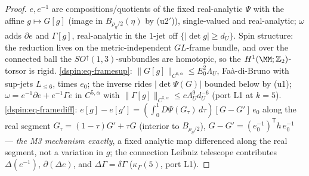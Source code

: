 \begin{proof}
$e,e^{-1}$ are compositions/quotients of the fixed real-analytic $\Psi$ with
the affine $g\mapsto G[g]$ (image in $B_{\rho_\eta/2}(\eta)$ by (u2$'$)),
single-valued and real-analytic; $\omega$ adds $\partial e$ and $\Gamma[g]$,
real-analytic in the $1$-jet off $\{|\det g|\ge d_U\}$. Spin structure: the
reduction lives on the metric-independent $GL$-frame bundle, and over the
connected ball the $SO^\uparrow(1,3)$-subbundles are homotopic, so the
$H^1(\MM;\mathbb Z_2)$-torsor is rigid. \eqref{dspin:eq-framesup}:
$\|G[g]\|_{C^{6,\alpha}}\le E_0^2\Lambda_U$, Fa\`a-di-Bruno with sup-jets
$L_{\le6}$, times $e_0$; the inverse rides $|\det\Psi(G)|$ bounded below by
(u1); $\omega=e^{-1}\partial e+e^{-1}\Gamma e$ in $C^{5,\alpha}$ with
$\|\Gamma[g]\|_{C^{5,\alpha}}\le c\Lambda_U^9d_U^{-6}$ (port L1 at $k=5$).
\eqref{dspin:eq-framediff}: $e[g]-e[g']=(\int_0^1 D\Psi(G_\tau)\,d\tau)[G-G']
\,e_0$ along the real segment $G_\tau=(1-\tau)G'+\tau G$ (interior to
$B_{\rho_\eta/2}$), $G-G'=(e_0^{-1})^{\mathsf T}h\,e_0^{-1}$ --- \emph{the M3
mechanism exactly}, a fixed analytic map differenced along the real segment,
not a variation in $g$; the connection Leibniz telescope contributes
$\Delta(e^{-1})$, $\partial(\Delta e)$, and $\Delta\Gamma=\delta\Gamma$
($\kappa_\Gamma(5)$, port L1).
\end{proof}

